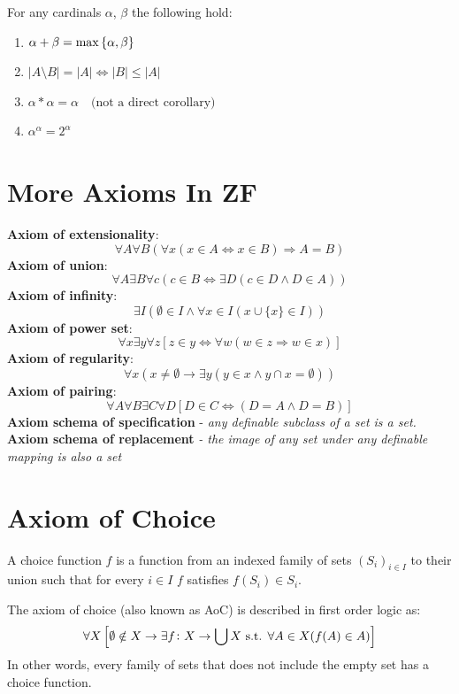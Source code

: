 \documentclass[11pt,a4paper]{article}
\begin{document}
For any cardinals $\alpha$, $\beta$ the following hold:
\begin{enumerate}
  \item $\alpha + \beta = \max\set{\alpha,\beta}$
  \item $|A \setminus B| = |A| \iff |B| \le |A|$
  \item $\alpha * \alpha = \alpha \quad\text{(not a direct corollary)}$
  \item $\alpha^\alpha = 2^\alpha$
\end{enumerate}

\newpage
\section{More Axioms In ZF}
\textbf{Axiom of extensionality}:
\[
	\forall A\forall B(\forall x(x\in A \iff x\in B)\Rightarrow A=B)
\]
\textbf{Axiom of union}:
\[
	\forall A \exists B \forall c(c\in B \iff \exists D(c\in D \land D\in A))
\]
\textbf{Axiom of infinity}:
\[
	\exists I(\emptyset \in I \land \forall x\in I (x\cup \{x\}\in I))
\]
\textbf{Axiom of power set}:
\[
	\forall x \exists y \forall z
	[z\in y \iff \forall w(w\in z \Rightarrow w\in x)]
\]
\textbf{Axiom of regularity}:
\[
	\forall 
	x(x\neq\emptyset \rightarrow \exists y(y\in x \land y\cap x = \emptyset))
\]
\textbf{Axiom of pairing}:
\[
	\forall A\forall B \exists C\forall D[D\in C \iff (D=A \land D=B)]
\]
\textbf{Axiom schema of specification} - \emph{any definable subclass of a set is a set.} \\
\textbf{Axiom schema of replacement} \emph{- the image of any set under any definable mapping is also a set}

\section{Axiom of Choice}
\begin{definition}
A choice function $f$ is a function from an indexed family of sets 
$(S_i)_{i\in I}$ to their union such that for every $i\in I$
$f$ satisfies $f(S_i) \in S_i$.
\end{definition}

\begin{definition}
The axiom of choice (also known as AoC) is described in first order logic as:
\[
	\forall X \left[\emptyset \notin X \rightarrow \exists 
    f \colon X \to \bigcup X \text{ s.t. } \forall A\in X(f(A)\in A)\right]
\]
In other words, every family of sets that does not include the empty set
has a choice function.
\end{definition}
\end{document}
